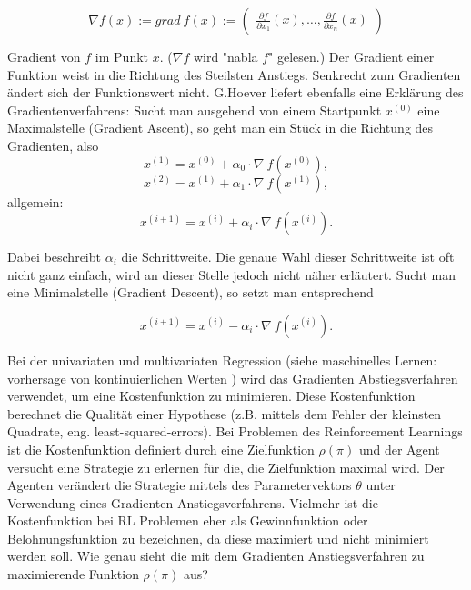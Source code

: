 \documentclass[conference]{IEEEtran}
\begin{document}
\begin{equation*}
\nabla f(x) := grad \: f(x) := \begin{pmatrix}
\frac{\partial f}{\partial x_1}(x), \hdots, \frac{\partial f}{\partial x_n}(x)
\end{pmatrix}
\end{equation*}

Gradient von $f$ im Punkt $x$. ($\nabla f$ wird "nabla $f$" gelesen.) Der Gradient einer Funktion weist in die Richtung des Steilsten Anstiegs. Senkrecht zum Gradienten ändert sich der Funktionswert nicht. G.Hoever \cite[vgl. S. 214]{hoever_14} liefert ebenfalls eine Erklärung des Gradientenverfahrens: Sucht man ausgehend von einem Startpunkt $x^{(0)}$ eine Maximalstelle (Gradient Ascent), so geht man ein Stück in die Richtung des Gradienten, also
\begin{equation*}
x^{(1)} = x^{(0)} + \alpha_0 \cdot \nabla \: f(x^{(0)}),
\end{equation*}
\begin{equation*}
x^{(2)} = x^{(1)} + \alpha_1 \cdot \nabla \: f(x^{(1)}),
\end{equation*}
allgemein:
\begin{equation*}
x^{(i+1)} = x^{(i)} + \alpha_i \cdot \nabla \: f(x^{(i)}).
\end{equation*}

Dabei beschreibt $\alpha_i$ die Schrittweite. Die genaue Wahl dieser Schrittweite ist oft nicht ganz einfach, wird an dieser Stelle jedoch nicht näher erläutert. Sucht man eine Minimalstelle (Gradient Descent), so setzt man entsprechend 

\begin{equation*}
x^{(i+1)} = x^{(i)} - \alpha_i \cdot \nabla \: f(x^{(i)}).
\end{equation*}

Bei der univariaten und multivariaten Regression (siehe maschinelles Lernen: vorhersage von kontinuierlichen Werten \cite{goodfellow_16}) wird das Gradienten Abstiegsverfahren verwendet, um eine Kostenfunktion zu minimieren. Diese Kostenfunktion berechnet die Qualität einer Hypothese (z.B. mittels dem Fehler der kleinsten Quadrate, eng. least-squared-errors). Bei Problemen des Reinforcement Learnings ist die Kostenfunktion definiert durch eine Zielfunktion $\rho(\pi)$ und der Agent versucht eine Strategie zu erlernen für die, die Zielfunktion maximal wird. Der Agenten verändert die Strategie mittels des Parametervektors $\theta$ unter Verwendung eines Gradienten Anstiegsverfahrens. Vielmehr ist die Kostenfunktion bei RL Problemen eher als Gewinnfunktion oder Belohnungsfunktion zu bezeichnen, da diese maximiert und nicht minimiert werden soll. Wie genau sieht die mit dem Gradienten Anstiegsverfahren zu maximierende Funktion $\rho(\pi)$ aus?
\end{document}
